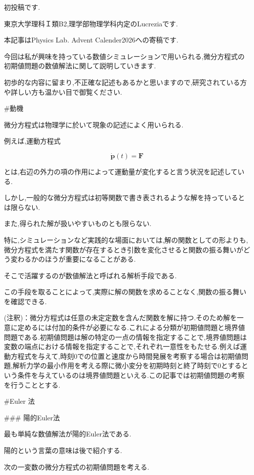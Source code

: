 

初投稿です.

東京大学理科Ｉ類B2,理学部物理学科内定のLucreziaです.

本記事はPhysics Lab. Advent Calender2026への寄稿です.

今回は私が興味を持っている数値シミュレーションで用いられる,微分方程式の初期値問題の数値解法に関して説明していきます.

初歩的な内容に留まり,不正確な記述もあるかと思いますので,研究されている方や詳しい方も温かい目で御覧ください.

#動機

微分方程式は物理学に於いて現象の記述によく用いられる.

例えば,運動方程式

$$\dot{\boldsymbol p}(t)=\boldsymbol F$$

とは,右辺の外力の項の作用によって運動量が変化すると言う状況を記述している.

しかし,一般的な微分方程式は初等関数で書き表されるような解を持っているとは限らない.

また,得られた解が扱いやすいものとも限らない.

特に,シミュレーションなど実践的な場面においては,解の関数としての形よりも,微分方程式を満たす関数が存在するとき引数を変化させると関数の振る舞いがどう変わるかのほうが重要になることがある.

そこで活躍するのが数値解法と呼ばれる解析手段である.

この手段を取ることによって,実際に解の関数を求めることなく,関数の振る舞いを確認できる.



(注釈)：微分方程式は任意の未定定数を含んだ関数を解に持つ.そのため解を一意に定めるには付加的条件が必要になる.これによる分類が初期値問題と境界値問題である.初期値問題は解の特定の一点の情報を指定することで,境界値問題は変数の端点における情報を指定することで,それぞれ一意性をもたせる.例えば運動方程式を与えて,時刻0での位置と速度から時間発展を考察する場合は初期値問題,解析力学の最小作用を考える際に微小変分を初期時刻と終了時刻で0とするという条件を与えているのは境界値問題といえる.この記事では初期値問題の考察を行うこととする.



#Euler 法

### 陽的Euler法

最も単純な数値解法が陽的Euler法である.

陽的という言葉の意味は後で紹介する.



次の一変数の微分方程式の初期値問題を考える.



